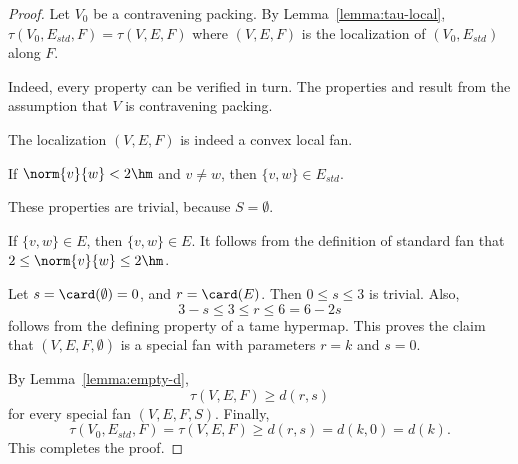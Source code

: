 \begin{proof}
  Let $V_0$ be a contravening packing.  By
  Lemma~\ref{lemma:tau-local}, $\tau(V_0,E_{std},F)=\tau(V,E,F)$ where
  $(V,E,F)$ is the localization of $(V_0,E_{std})$ along $F$.

    Indeed,
  every property can be verified in turn.  The properties
   and  result from the assumption that
  $V$ is contravening packing.

  The localization $(V,E,F)$ is indeed a convex local fan.

 If $\norm{v}{w}<2\hm$ and $v\ne w$, then $\{v,w\}\in
E_{std}$.

  These properties are trivial, because
$S=\emptyset$.

 If $\{v,w\}\in E$, then $\{v,w\}\in E$.  It follows from
the definition of standard fan that $2\le \norm{v}{w}\le 2\hm$.

 Let $s=\card(\emptyset) = 0$, and $r=\card(E)$.  Then
$0\le s\le 3$ is trivial. Also,
\begin{displaymath}3-s \le 3\le r \le 6=6 - 2s\end{displaymath}
follows from the defining property  of a tame
hypermap.  This proves the claim that $(V,E,F,\emptyset)$ is a special fan with parameters $r=k$ and $s=0$.

By Lemma~\ref{lemma:empty-d}, 
\begin{displaymath}
\tau(V,E,F) \ge d (r,s)
\end{displaymath}
for every special fan $(V,E,F,S)$. 
Finally, 
\begin{displaymath}
\tau(V_0,E_{std},F)=\tau(V,E,F) \ge d(r,s) = d(k,0) = d(k).
\end{displaymath}  
This completes the proof.
\end{proof}



